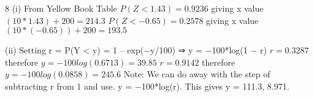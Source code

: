\documentclass[a4paper,12pt]{article}
\begin{document}


8
(i)
From Yellow Book Table
$P(Z < 1.43) = 0.9236$ giving x value $(10*1.43) + 200 = 214.3$
$P(Z < −0.65) = 0.2578$ giving x value $(10*(−0.65)) + 200 = 193.5$

(ii)
Setting r = P(Y < y) = 1 – exp(−y/100) ⇒ y = −100*log(1 − r)
$r = 0.3287$ therefore $y = −100log(0.6713) = 39.85$
$r = 0.9142$ therefore $y = −100log(0.0858) = 245.6$
Note: We can do away with the step of subtracting r from 1 and use.
y = −100*log(r). This gives y = 111.3, 8.971.
\end{document}
